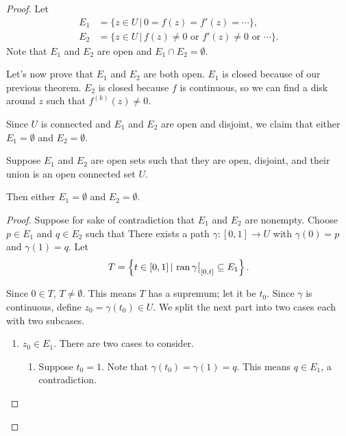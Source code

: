 \begin{proof}
    Let
    \begin{align*}
        E_1 &= \{ z \in U \, | \, 0 = f(z) = f'(z) = \cdots \}, \\
        E_2 &= \{ z \in U \, | \, f(z) \ne 0 \text{\ or\ }
        f'(z) \ne 0 \text{\ or\ } \cdots \}.
    \end{align*}
    Note that $E_1$ and $E_2$ are open and $E_1 \cap E_2 = \emptyset$.

    \noindent
    Let's now prove that $E_1$ and $E_2$ are both open.
    $E_1$ is closed because of our previous theorem.
    $E_2$ is closed because $f$ is continuous, so we can find
    a disk around $z$ such that $f^{(k)}(z) \ne 0$.

    \noindent
    Since $U$ is connected and $E_1$ and $E_2$ are open and disjoint,
    we claim that either $E_1 = \emptyset$ and $E_2 = \emptyset$.

    \begin{lemma}
        Suppose $E_1$ and $E_2$ are open sets such that they are
        open, disjoint, and their union is an open connected
        set $U$.
        
        \noindent
        Then either $E_1 = \emptyset$ and $E_2 = \emptyset$.
    \end{lemma}

    \begin{proof}
        Suppose for sake of contradiction that $E_1$
        and $E_2$ are nonempty.
        Choose $p \in E_1$ and $q \in E_2$ such that
        There exists a path
        $\gamma : [0,1] \to U$ with $\gamma(0) = p$
        and $\gamma(1) = q$.
        Let
        \[ T = \left\{ t \in [0,1] \, | \, \operatorname{ran}{\gamma\big|_{[0, t]}} 
            \subseteq E_1 \right\}.
        \]

        Since $0 \in T$, $T \ne \emptyset$.  
        This means $T$ has a supremum; let it be $t_0$.
        Since $\gamma$ is continuous, define $z_0 = \gamma(t_0) \in U$.
        We split the next part into two cases each with two
        subcases.
        \begin{enumerate}
            \item $z_0 \in E_1$.  There are two cases to consider.
                \begin{enumerate}
                    \item Suppose $t_0 = 1$.
                        Note that $\gamma(t_0) = \gamma(1) = q$.
                        This means $q \in E_1$, a contradiction.


\end{enumerate}
\end{enumerate}
\end{proof}
\end{proof}
